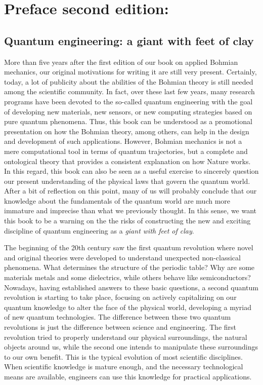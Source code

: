 \documentclass[nofootinbib, secnumarabic, amsmath, nobibnotes,10pt,aps,pra]{revtex4-1}
\begin{document}
\section{Preface second edition:\label{preface2}}
\subsection*{Quantum engineering: a giant with feet of clay}

More than five years after the first edition of our book on applied Bohmian mechanics, our original motivations for writing it are still very present. Certainly, today, a lot of publicity about the abilities of the Bohmian theory is still needed among the scientific community. In fact, over these last few years, many research programs have been devoted to the so-called quantum engineering with the goal of developing new materials, new sensors, or new computing strategies based on pure quantum phenomena. Thus, this book can be understood as a promotional presentation on how the Bohmian theory, among others, can help in the design and development of such applications. However, Bohmian mechanics is not a mere computational tool in terms of quantum trajectories, but a complete and ontological theory that provides a consistent explanation on how Nature works. In this regard, this book can also be seen as a useful exercise to sincerely question our present understanding of the physical laws that govern the quantum world. After a bit of reflection on this point, many of us will probably conclude that our knowledge about the fundamentals of the quantum world are much more immature and imprecise than what we previously thought.  In this sense, we want this book to be a warning on the the risks of constructing the new and exciting discipline of quantum engineering as a \emph{giant with feet of clay}. 

The beginning of the 20th century saw the first quantum revolution where novel and original theories were developed to understand unexpected non-classical phenomena. What determines the structure of the periodic table? Why are some materials metals and some dielectrics, while others behave like semiconductors? Nowadays, having established answers to these basic questions, a second quantum revolution is starting to take place, focusing on actively capitalizing on our quantum knowledge to alter the face of the physical world, developing a myriad of new quantum technologies. The difference between these two quantum revolutions is just the difference between science and engineering. The first revolution tried to properly understand our physical surroundings, the natural objects around us, while the second one intends to manipulate these surroundings to our own benefit. This is the typical evolution of most scientific disciplines. When scientific knowledge is mature enough, and the necessary technological means are available, engineers can use this knowledge for practical applications.
\end{document}

